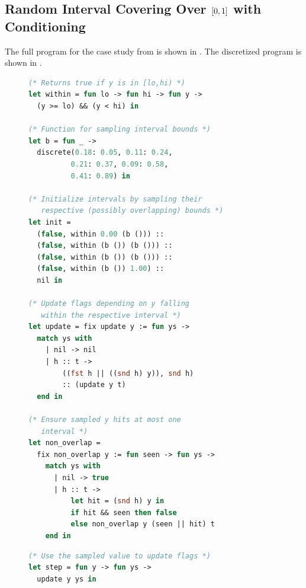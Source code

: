 \subsection{Random Interval Covering Over $\boldmath{[0,1]}$ with Conditioning}\label{sec:epsball-observe}
The full program for the case study from  is shown in . The discretized program is shown in .

\begin{figure}[t]
    \centering
    \begin{minipage}[t]{0.46\textwidth}
    \vspace{0pt}
    \begin{lstlisting}[aboveskip=0.4em,belowskip=0.4em,
      language=OCaml,
      escapechar=!,
      numbers=right,
      stepnumber=1,
      numberstyle=\color{gray}\scriptsize,
      numbersep=7pt,
      basicstyle=\ttfamily\footnotesize,
      commentstyle=\color{ForestGreen}\itshape]
(* Returns true if y is in [lo,hi) *)
let within = fun lo -> fun hi -> fun y ->
  (y >= lo) && (y < hi) in 

(* Function for sampling interval bounds *)
let b = fun _ ->
  discrete(0.18: 0.05, 0.11: 0.24,
          0.21: 0.37, 0.09: 0.58,
          0.41: 0.89) in

(* Initialize intervals by sampling their
   respective (possibly overlapping) bounds *)
let init =
  (false, within 0.00 (b ())) ::
  (false, within (b ()) (b ())) ::
  (false, within (b ()) (b ())) ::
  (false, within (b ()) 1.00) ::
  nil in 

(* Update flags depending on y falling 
   within the respective interval *)
let update = fix update y := fun ys ->
  match ys with
    | nil -> nil
    | h :: t ->
        ((fst h || ((snd h) y)), snd h)
        :: (update y t)
  end in

(* Ensure sampled y hits at most one 
   interval *)
let non_overlap = 
  fix non_overlap y := fun seen -> fun ys ->
    match ys with
      | nil -> true
      | h :: t ->
          let hit = (snd h) y in
          if hit && seen then false
          else non_overlap y (seen || hit) t
    end in
    \end{lstlisting}
    \end{minipage}
    \hfill
    \hspace{-4pt}%
    \begin{minipage}[t]{0.46\textwidth}
    \vspace{0pt}
    \begin{lstlisting}[aboveskip=0.4em,belowskip=0.4em,
      language=OCaml,
      escapechar=! ,
      numbers=right,
      stepnumber=1,
      firstnumber=last,
      numberstyle=\color{gray}\scriptsize,
      numbersep=7pt,
      basicstyle=\ttfamily\footnotesize,
      commentstyle=\color{ForestGreen}\itshape]
(* Use the sampled value to update flags *)
let step = fun y -> fun ys ->
  update y ys in


\end{lstlisting}
\end{minipage}
\end{figure}
